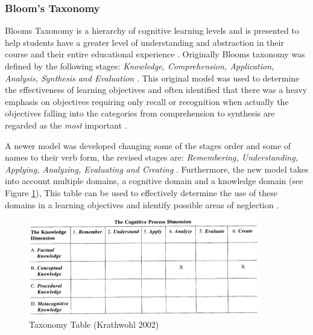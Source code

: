 \documentclass[12pt,a4paper]{article}
\begin{document}
\subsubsection{Bloom's Taxonomy} 
Blooms Taxonomy is a hierarchy of cognitive learning levels and is presented to help students have a greater level of understanding and abstraction in their course and their entire educational experience \cite{bloom1965bloom}. Originally Blooms taxonomy was defined by the following stages: \emph{Knowledge, Comprehension, Application, Analysis, Synthesis and Evaluation} \cite{anderson1994bloom}. This original model was used to determine the effectiveness of learning objectives and often identified that there was a heavy emphasis on objectives requiring only recall or recognition when actually the objectives falling into the categories from comprehension to synthesis are regarded as the \emph{most} important \cite{krathwohl2002revision}.  


A newer model was developed changing some of the stages order and some of names to their verb form, the revised stages are: \emph{Remembering, Understanding, Applying, Analyzing, Evaluating and Creating} \cite{forehand2010bloom}. Furthermore, the new model takes into account multiple domains, a cognitive domain and a knowledge domain (see Figure \ref{fig:fig2}),  This table can be used to effectively determine the use of these domains in a learning objectives and identify possible areas of neglection \cite{krathwohl2002revision2}. 

\begin{figure}[h]
    \centering
    \includegraphics[width=0.9\textwidth]{Figs/blooms.PNG} 
    \caption{Taxonomy Table (Krathwohl 2002)}
    \label{fig:fig2}
\end{figure}  
\end{document}
